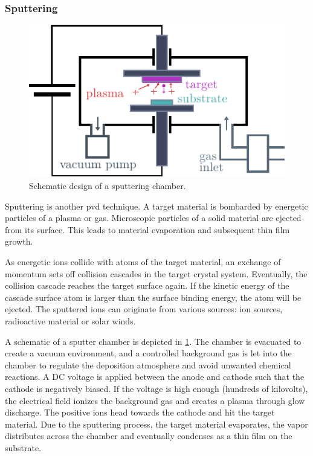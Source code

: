 \subsubsection{Sputtering}
\begin{figure}
	\includegraphics{../assets/sputtering.pdf}
	\caption{Schematic design of a sputtering chamber. }
	\label{fig:sputtering}
\end{figure}

Sputtering is another \ac{pvd} technique. 
A target material is bombarded by energetic particles of a plasma or gas.
Microscopic particles of a solid material are ejected from its surface.
This leads to material evaporation and subsequent thin film growth. 

As energetic ions collide with atoms of the target material, 
an exchange of momentum sets off collision cascades in the target crystal system.
Eventually, the collision cascade reaches the target surface again. 
If the kinetic energy of the cascade surface atom is larger than the surface binding 
energy, the atom will be ejected.
The sputtered ions can originate from various sources: ion sources, radioactive material
or solar winds.

A schematic of a sputter chamber is depicted in \cref{fig:sputtering}.
The chamber is evacuated to create a vacuum environment, and a controlled background gas
is let into the chamber to regulate the deposition atmosphere and avoid unwanted 
chemical reactions.
A DC voltage is applied between the anode and cathode such that the cathode is 
negatively biased.
If the voltage is high enough (hundreds of kilovolts), the electrical field ionizes
the background gas and creates a plasma through glow discharge. 
The positive ions head towards the cathode and hit the target material.
Due to the sputtering process, the target material evaporates, the vapor distributes 
across the chamber and eventually condenses as a thin film on the substrate. 

